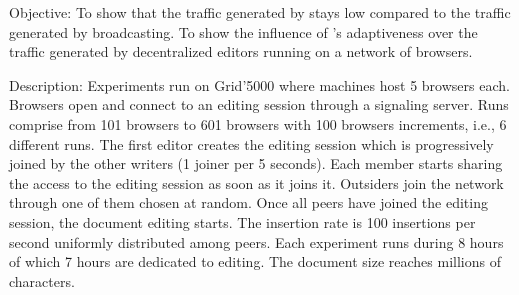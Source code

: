 \begin{asparadesc}
\item [Objective:] To show that the traffic generated by \SPRAY stays low
  compared to the traffic generated by broadcasting. To show the influence of
  \SPRAY's adaptiveness over the traffic generated by decentralized editors
  running on a network of browsers.
\item [Description:] Experiments run on Grid'5000 where machines host 5 browsers
  each. Browsers open \CRATE and connect to an editing session through a
  signaling server.  Runs comprise from 101 browsers to 601 browsers with 100
  browsers increments, i.e., 6 different runs.  The first editor creates the
  editing session which is progressively joined by the other writers (1 joiner
  per 5 seconds). Each member starts sharing the access to the editing session
  as soon as it joins it. Outsiders join the network through one of them chosen
  at random. Once all peers have joined the editing session, the document
  editing starts. The insertion rate is 100 insertions per second uniformly
  distributed among peers. Each experiment runs during 8 hours of which 7 hours
  are dedicated to editing. The document size reaches millions of characters.


\begin{figure}
\centering
{}


\end{figure}
\end{asparadesc}

